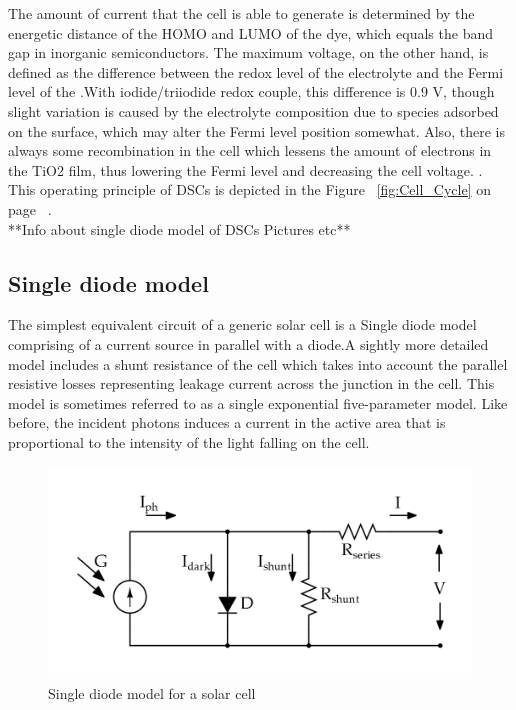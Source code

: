 The amount of current that the cell is able to generate is determined by the energetic distance of the \ac{HOMO} and \ac{LUMO} of the dye, which equals the band gap in inorganic semiconductors. The maximum voltage, on the other hand, is defined as the difference between the redox level of the electrolyte and the Fermi level of the .With iodide/triiodide redox couple, this difference is 0.9 V, though slight variation is caused by the electrolyte composition due to species adsorbed on the  surface, which may alter the Fermi level position somewhat. Also, there is always some recombination in the cell which lessens the amount of electrons in the TiO2 film, thus lowering the Fermi level and decreasing the cell voltage. \cite{toivola2010dye}.  This operating principle of \ac{DSCs} is depicted in the Figure ~\ref{fig:Cell_Cycle} on page ~\pageref{fig:Cell_Cycle}. \\


**Info about single diode model of DSCs Pictures etc** \newline

  
  
\subsection{Single diode model}\label{sec:SDM}
The simplest equivalent circuit of a generic solar cell is a Single diode model comprising of a current source in parallel with a diode.A sightly more detailed model includes a shunt resistance of the cell which takes into account the parallel resistive losses representing leakage current across the junction in the cell. This model is sometimes referred to as a single exponential five-parameter model\cite{vignati2012solutions}. Like before, the incident photons induces a current in the active area that is proportional to the intensity of the light falling on the cell.

 \begin{figure}[H]
  \begin{center}
  \includegraphics[width=\textwidth]{images/simplified_single_diode_model}
  \caption{ Single diode model for a solar cell }
  \label{fig:EQu_cell}
  \end{center}
  \end{figure}
  
